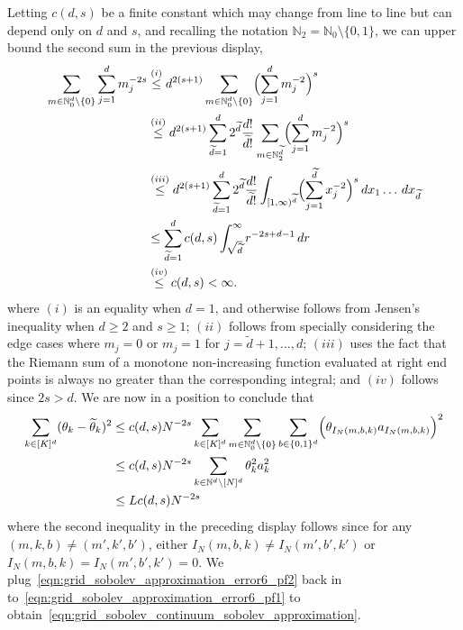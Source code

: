\documentclass{article}
\newcommand{\1}{\mathbf{1}}
\newcommand{\Nbb}{\mathbb{N}}
\newcommand{\wt}[1]{\widetilde{#1}}
\theoremstyle{alden}
\theoremstyle{aldenthm}
\theoremstyle{definition}
\theoremstyle{remark}
\begin{document}
Letting $c(d,s)$ be a finite constant which may change from line to line but can depend only on $d$ and $s$, and recalling the notation $\Nbb_2 = \Nbb_0 \setminus \{0,1\}$, we can upper bound the second sum in the previous display,
\begin{align*}
\sum_{m \in \Nbb_0^d \setminus \{0\}}\sum_{j = 1}^{d} m_j^{-2s} & \overset{(i)}{\leq} d^{2(s + 1)} \sum_{m \in \Nbb_0^d \setminus \{0\}} \Bigl(\sum_{j = 1}^{d} m_j^{-2}\Bigr)^s \\
& \overset{(ii)}{\leq} d^{2(s + 1)} \sum_{\wt{d} = 1}^{d} 2^{\wt{d}} \frac{d!}{\wt{d}!} \sum_{m \in \Nbb_2^{\wt{d}}} \Bigl(\sum_{j = 1}^{d} m_j^{-2}\Bigr)^s \\
& \overset{(iii)}{\leq} d^{2(s + 1)} \sum_{\wt{d} = 1}^{d} 2^{\wt{d}} \frac{d!}{\wt{d}!} \int_{[1,\infty)^{\wt{d}}} \Bigl(\sum_{j = 1}^{\wt{d}} x_j^{-2}\Bigr)^{s} \,dx_1 \ldots \,dx_{\wt{d}} \\
& \leq \sum_{\wt{d} = 1}^{d} c(d,s) \int_{\sqrt{\wt{d}}}^{\infty} r^{-2s + d - 1} \,dr \\
& \overset{(iv)}{\leq} c(d,s) < \infty.
\end{align*}
where $(i)$ is an equality when $d = 1$, and otherwise follows from Jensen's inequality when $d \geq 2$ and $s \geq 1$; $(ii)$ follows from specially considering the edge cases where $m_j = 0$ or $m_j = 1$ for $j = \wt{d} + 1,\ldots, d$; $(iii)$ uses the fact that the Riemann sum of a monotone non-increasing function evaluated at right end points is always no greater than the corresponding integral; and $(iv)$ follows since $2s > d$. We are now in a position to conclude that
\begin{align}
\sum_{k \in [K]^d} (\theta_k - \wt{\theta}_k)^2 & \leq c(d,s) N^{-2s} \sum_{k \in [K]^d} \sum_{m \in \Nbb_0^d \setminus \{0\}} \sum_{b \in \{0,1\}^d} \Bigl(\theta_{I_N(m,b,k)}a_{I_N(m,b,k)}\Bigr)^2 \nonumber \\
& \leq c(d,s) N^{-2s} \sum_{k \in \Nbb^d \setminus [N]^d} \theta_k^2 a_k^2 \nonumber \\
& \leq L c(d,s) N^{-2s} \label{eqn:grid_sobolev_approximation_error6_pf2}
\end{align}
where the second inequality in the preceding display follows since for any $(m,k,b) \neq (m',k',b')$, either $I_N(m,b,k) \neq I_N(m',b',k')$ or $I_N(m,b,k) = I_N(m',b',k') = 0$. We plug~\eqref{eqn:grid_sobolev_approximation_error6_pf2} back in to~\eqref{eqn:grid_sobolev_approximation_error6_pf1} to obtain~\eqref{eqn:grid_sobolev_continuum_sobolev_approximation}.
\end{document}
